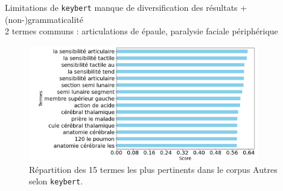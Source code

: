 \begin{frame}{Limitations de \texttt{keybert}}
\danger{} manque de diversification des résultats + (non-)grammaticalité\\
{\small 2 termes communs : \og{}articulations de épaule\fg{}, \og{}paralysie faciale périphérique\fg{}}
    \begin{figure}[!ht]
        \centering
        \includegraphics[width=100mm,scale=0.5]{pic/termes_keybert_autres.png}
        \caption{Répartition des 15 termes les plus pertinents dans le corpus \textrm{Autres} selon \texttt{keybert}.}
        \label{fig:enter-label}
    \end{figure}
\end{frame}

